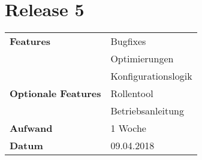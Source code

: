 \section*{Release 5}
\label{sec:release_5}

\begin{tabular}{p{5cm} p{9cm}}
    \textbf{Features} &  Bugfixes \\
    & Optimierungen \\
    & Konfigurationslogik \\
    \textbf{Optionale Features} &  Rollentool \\
    & Betriebsanleitung \\
    \hline
    \textbf{Aufwand} & 1 Woche\\
    \hline
    \textbf{Datum} & 09.04.2018
\end{tabular}
